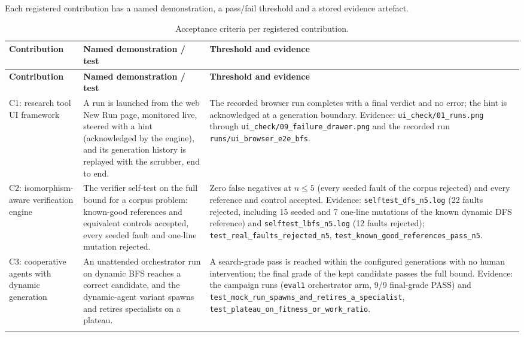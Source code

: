 Each registered contribution has a named demonstration, a pass/fail threshold
and a stored evidence artefact.

\begin{center}
\footnotesize
\setlength{\tabcolsep}{5pt}
\begin{longtable}{@{}>{\raggedright\arraybackslash}p{}>{\raggedright\arraybackslash}p{}>{\raggedright\arraybackslash}p{}@{}}
\toprule
\textbf{Contribution} & \textbf{Named demonstration / test} & \textbf{Threshold and evidence} \\
\midrule
\endfirsthead
\toprule
\textbf{Contribution} & \textbf{Named demonstration / test} & \textbf{Threshold and evidence} \\
\midrule
\endhead
\bottomrule
\endfoot

C1: research tool UI framework & A run is launched from the web New Run page,
monitored live, steered with a hint (acknowledged by the engine), and its
generation history is replayed with the scrubber, end to end. & The recorded
browser run completes with a final verdict and no error; the hint is acknowledged
at a generation boundary. Evidence: \texttt{ui\_check/01\_runs.png} through
\texttt{ui\_check/09\_failure\_drawer.png} and the recorded run
\texttt{runs/ui\_browser\_e2e\_bfs}. \\
\addlinespace[2pt]

C2: isomorphism-aware verification engine & The verifier self-test on the full
bound for a corpus problem: known-good references and equivalent controls
accepted, every seeded fault and one-line mutation rejected. & Zero false
negatives at $n \le 5$ (every seeded fault of the corpus rejected) and every reference and control
accepted. Evidence: \texttt{selftest\_dfs\_n5.log} (22 faults rejected, including
15 seeded and 7 one-line mutations of the known dynamic DFS reference) and
\texttt{selftest\_lbfs\_n5.log} (12 faults rejected); \texttt{test\_real\_faults\_rejected\_n5},
\texttt{test\_known\_good\_references\_pass\_n5}. \\
\addlinespace[2pt]

C3: cooperative agents with dynamic generation & An unattended orchestrator run
on dynamic BFS reaches a correct candidate, and the dynamic-agent variant spawns
and retires specialists on a plateau. & A search-grade pass is reached within the
configured generations with no human intervention; the final grade of the kept
candidate passes the full bound. Evidence: the campaign runs
(\texttt{eval1} orchestrator arm, 9/9 final-grade PASS) and
\texttt{test\_mock\_run\_spawns\_and\_retires\_a\_specialist},
\texttt{test\_plateau\_on\_fitness\_or\_work\_ratio}. \\
\bottomrule
\caption{Acceptance criteria per registered contribution.}
\label{tab:acceptance}
\end{longtable}
\end{center}

